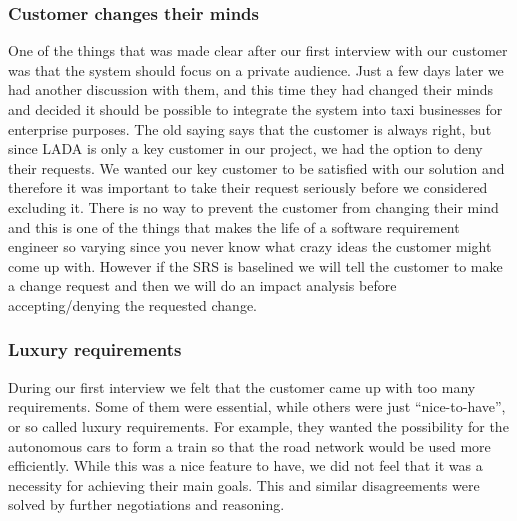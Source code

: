 \documentclass[10pt]{article}
\begin{document}
\subsubsection{Customer changes their minds}
One of the things that was made clear after our first interview with our customer was that the system should focus on a private audience. Just a few days later we had another discussion with them, and this time they had changed their minds and decided it should be possible to integrate the system into taxi businesses for enterprise purposes. The old saying says that the customer is always right, but since LADA is only a key customer in our project, we had the option to deny their requests. We wanted our key customer to be satisfied with our solution and therefore it was important to take their request seriously before we considered excluding it. There is no way to prevent the customer from changing their mind and this is one of the things that makes the life of a software requirement engineer so varying since you never know what crazy ideas the customer might come up with. However if the SRS is baselined we will tell the customer to make a change request and then we will do an impact analysis before accepting/denying the requested change.

\subsubsection{Luxury requirements}
During our first interview we felt that the customer came up with too many requirements. Some of them were essential, while others were just “nice-to-have”, or so called luxury requirements. For example, they wanted the possibility for the autonomous cars to form a train so that the road network would be used more efficiently. While this was a nice feature to have, we did not feel that it was a necessity for achieving their main goals. This and similar disagreements were solved by further negotiations and reasoning. 
\end{document}
